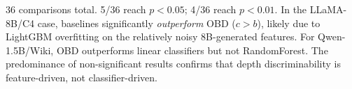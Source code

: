 \begin{table}[t]
\vspace{4pt}
\footnotesize
36 comparisons total. 5/36 reach $p < 0.05$; 4/36 reach $p < 0.01$.
In the LLaMA-8B/C4 case, baselines significantly \emph{outperform} OBD ($c > b$), likely due to LightGBM overfitting on the relatively noisy 8B-generated features.
For Qwen-1.5B/Wiki, OBD outperforms linear classifiers but not RandomForest.
The predominance of non-significant results confirms that depth discriminability is feature-driven, not classifier-driven.
\end{table}
